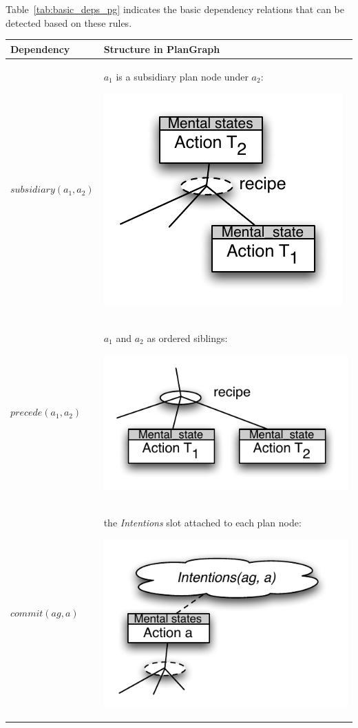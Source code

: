 Table~\ref{tab:basic_deps_pg} indicates the basic dependency relations that can be detected based on these rules. 

\begin{center}
\begin{longtable}{|p{4.5cm}|p{8.5cm}|}
\hline
Dependency & Structure in PlanGraph\\
\hline
$subsidiary(a_1, a_2)$ &  $a_1$ is a subsidiary plan node under $a_2$: \par \includegraphics[scale=0.6]{subsidiary.pdf}\\
\hline
$precede(a_1, a_2)$ &  $a_1$ and $a_2$ as ordered siblings: \par \includegraphics[scale=0.6]{precede.pdf}\\
\hline
$commit(ag,a)$ & the \emph{Intentions} slot attached to each plan node: \par \includegraphics[scale=0.6]{commit.pdf}\\

\end{longtable}
\end{center}
